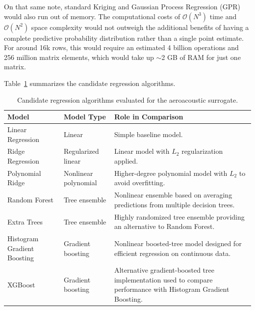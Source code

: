 \documentclass[11pt]{article}
\begin{document}
On that same note, standard Kriging and Gaussian Process Regression (GPR) would also run out of memory. The computational costs of $\mathcal{O}(N^3)$ time and $\mathcal{O}(N^2)$ space complexity would not outweigh the additional benefits of having a complete predictive probability distribution rather than a single point estimate. For around 16k rows, this would require an estimated 4 billion operations and 256 million matrix elements, which would take up $\sim$2 GB of RAM for just one matrix.

Table~\ref{tab:candidate-models} summarizes the candidate regression algorithms.

\begin{table}[htbp]
    \centering
    \caption{Candidate regression algorithms evaluated for the
    aeroacoustic surrogate.}
    \label{tab:candidate-models}

    \begin{tabularx}{\textwidth}{
        >{\raggedright\arraybackslash}p{}
        >{\raggedright\arraybackslash}p{}
        >{\raggedright\arraybackslash}X
    }
        \toprule
        \textbf{Model} &
        \textbf{Model Type} &
        \textbf{Role in Comparison} \\
        \midrule

        Linear Regression
        & Linear
        & Simple baseline model. \\

        Ridge Regression
        & Regularized linear
        & Linear model with $L_2$ regularization applied. \\

        Polynomial Ridge
        & Nonlinear polynomial
        & Higher-degree polynomial model with $L_2$ to avoid overfitting. \\

        Random Forest
        & Tree ensemble
        & Nonlinear ensemble based on averaging predictions from
          multiple decision trees. \\

        Extra Trees
        & Tree ensemble
        & Highly randomized tree ensemble providing an alternative
          to Random Forest. \\

        Histogram Gradient Boosting
        & Gradient boosting
        & Nonlinear boosted-tree model designed for efficient
          regression on continuous data. \\

        XGBoost
        & Gradient boosting
        & Alternative gradient-boosted tree implementation used to
          compare performance with Histogram Gradient Boosting. \\

        \bottomrule
    \end{tabularx}
\end{table}
\end{document}
